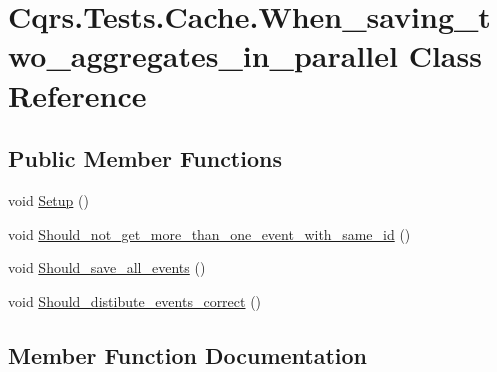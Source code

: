 \hypertarget{classCqrs_1_1Tests_1_1Cache_1_1When__saving__two__aggregates__in__parallel}{}\section{Cqrs.\+Tests.\+Cache.\+When\+\_\+saving\+\_\+two\+\_\+aggregates\+\_\+in\+\_\+parallel Class Reference}
\label{classCqrs_1_1Tests_1_1Cache_1_1When__saving__two__aggregates__in__parallel}
\subsection*{Public Member Functions}
\begin{DoxyCompactItemize}
\item 
void \hyperlink{classCqrs_1_1Tests_1_1Cache_1_1When__saving__two__aggregates__in__parallel_a85461450e744a14af6f39fd3fd1d97c2_a85461450e744a14af6f39fd3fd1d97c2}{Setup} ()
\item 
void \hyperlink{classCqrs_1_1Tests_1_1Cache_1_1When__saving__two__aggregates__in__parallel_a88c5e658e349c7687a028b2c7b60e514_a88c5e658e349c7687a028b2c7b60e514}{Should\+\_\+not\+\_\+get\+\_\+more\+\_\+than\+\_\+one\+\_\+event\+\_\+with\+\_\+same\+\_\+id} ()
\item 
void \hyperlink{classCqrs_1_1Tests_1_1Cache_1_1When__saving__two__aggregates__in__parallel_ae57d21af07695d19afd23307ead361f7_ae57d21af07695d19afd23307ead361f7}{Should\+\_\+save\+\_\+all\+\_\+events} ()
\item 
void \hyperlink{classCqrs_1_1Tests_1_1Cache_1_1When__saving__two__aggregates__in__parallel_aae0537250e2e48c70079e4b23ec4a602_aae0537250e2e48c70079e4b23ec4a602}{Should\+\_\+distibute\+\_\+events\+\_\+correct} ()
\end{DoxyCompactItemize}


\subsection{Member Function Documentation}
\mbox{\label{classCqrs_1_1Tests_1_1Cache_1_1When__saving__two__aggregates__in__parallel_a85461450e744a14af6f39fd3fd1d97c2_a85461450e744a14af6f39fd3fd1d97c2}} 
